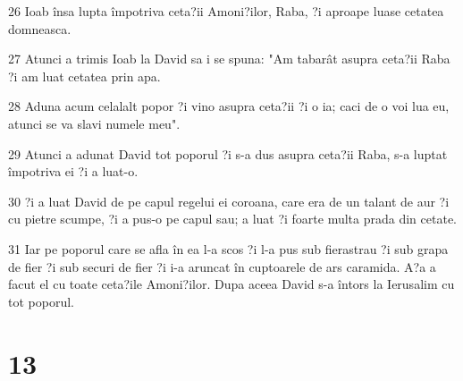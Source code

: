 \par 26 Ioab însa lupta împotriva ceta?ii Amoni?ilor, Raba, ?i aproape luase cetatea domneasca.
\par 27 Atunci a trimis Ioab la David sa i se spuna: "Am tabarât asupra ceta?ii Raba ?i am luat cetatea prin apa.
\par 28 Aduna acum celalalt popor ?i vino asupra ceta?ii ?i o ia; caci de o voi lua eu, atunci se va slavi numele meu".
\par 29 Atunci a adunat David tot poporul ?i s-a dus asupra ceta?ii Raba, s-a luptat împotriva ei ?i a luat-o.
\par 30 ?i a luat David de pe capul regelui ei coroana, care era de un talant de aur ?i cu pietre scumpe, ?i a pus-o pe capul sau; a luat ?i foarte multa prada din cetate.
\par 31 Iar pe poporul care se afla în ea l-a scos ?i l-a pus sub fierastrau ?i sub grapa de fier ?i sub securi de fier ?i i-a aruncat în cuptoarele de ars caramida. A?a a facut el cu toate ceta?ile Amoni?ilor. Dupa aceea David s-a întors la Ierusalim cu tot poporul.

\chapter{13}

